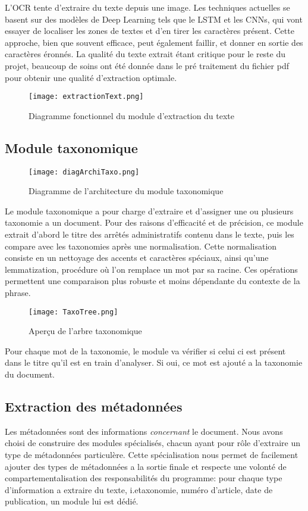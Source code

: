 L'OCR tente d'extraire du texte depuis une image.
Les techniques actuelles se basent sur des modèles de Deep Learning tels que le LSTM et les CNNs, qui vont essayer de localiser les zones de textes et d'en tirer les caractères présent.
Cette approche, bien que souvent efficace, peut également faillir, et donner en sortie des caractères éronnés.
La qualité du texte extrait étant critique pour le reste du projet, beaucoup de soins ont été donnée dans le pré traitement du fichier pdf pour obtenir une qualité d'extraction optimale.

\begin{figure}[h!]
  \centering
	\texttt{[image: extractionText.png]}
	\caption[]{Diagramme fonctionnel du module d'extraction du texte}
  \label{}
\end{figure}


\subsection{Module taxonomique}

\begin{figure}[h!]
  \centering
  \texttt{[image: diagArchiTaxo.png]}
	\caption[]{Diagramme de l'architecture du module taxonomique}
  \label{}
\end{figure}


Le module taxonomique a pour charge d'extraire et d'assigner une ou plusieurs taxonomie a un document.
Pour des raisons d'efficacité et de précision, ce module extrait d'abord le titre des arrêtés administratifs contenu dans le texte, puis les compare avec les taxonomies après une normalisation.
Cette normalisation consiste en un nettoyage des accents et caractères spéciaux, ainsi qu'une lemmatization, procédure où l'on remplace un mot par sa racine.
Ces opérations permettent une comparaison plus robuste et moins dépendante du contexte de la phrase. 

\begin{figure}[h!]
  \centering
  \texttt{[image: TaxoTree.png]}
	\caption[]{Aperçu de l'arbre taxonomique}
  \label{fig:tree}
\end{figure}

Pour chaque mot de la taxonomie, le module va vérifier si celui ci est présent dans le titre qu'il est en train d'analyser.
Si oui, ce mot est ajouté a la taxonomie du document.

\subsection{Extraction des métadonnées}
Les métadonnées sont des informations \textit{concernant} le document.
Nous avons choisi de construire des modules spécialisés, chacun ayant pour rôle d'extraire un type de métadonnées particulère.
Cette spécialisation nous permet de facilement ajouter des types de métadonnées a la sortie finale et respecte une volonté de compartementalisation des responsabilités du programme: pour chaque type d'information a extraire du texte, i.e\. taxonomie, numéro d'article, date de publication, un module lui est dédié. 

